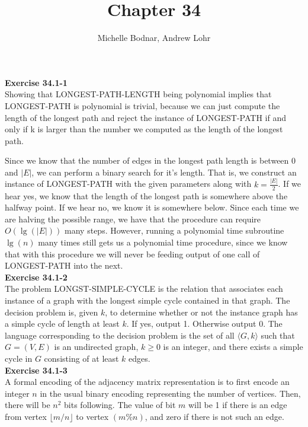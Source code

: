 \documentclass{article}
\title{Chapter 34}
\author{Michelle Bodnar, Andrew Lohr}
\begin{document}
\maketitle

\noindent\textbf{Exercise 34.1-1}\\

Showing that LONGEST-PATH-LENGTH being polynomial implies that LONGEST-PATH is polynomial is trivial, because we can just compute the length of the longest path and reject the instance of LONGEST-PATH if and only if k is larger than the number we computed as the length of the longest path.

Since we know that the number of edges in the longest path length is between $0$ and $|E|$, we can perform a binary search for it's length. That is, we construct an instance of LONGEST-PATH with the given parameters along with $k = \frac{|E|}{2}$. If we hear yes, we know that the length of the longest path is somewhere above the halfway point. If we hear no, we know it is somewhere below. Since each time we are halving the possible range, we have that the procedure can require $O(\lg(|E|))$ many steps. However, running a polynomial time subroutine $\lg(n)$ many times still gets us a polynomial time procedure, since we know that with this procedure we will never be feeding output of one call of LONGEST-PATH into the next.\\

\noindent\textbf{Exercise 34.1-2}\\

The problem LONGST-SIMPLE-CYCLE is the relation that associates each instance of a graph with the longest simple cycle contained in that graph.  The decision problem is, given $k$, to determine whether or not the instance graph has a simple cycle of length at least $k$.  If yes, output 1. Otherwise output 0.  The language corresponding to the decision problem is the set of all $\langle G, k \rangle$ such that $G = (V,E)$ is an undirected graph, $k\geq 0$ is an integer, and there exists a simple cycle in $G$ consisting of at least $k$ edges. \\

\noindent\textbf{Exercise 34.1-3}\\

A formal encoding of the adjacency matrix representation is to first encode an integer $n$ in the usual binary encoding representing the number of vertices. Then, there will be $n^2$ bits following. The value of bit $m$ will be 1 if there is an edge from vertex $\lfloor m/n \rfloor$ to vertex $(m\%n)$, and zero if there is not such an edge.
\end{document}
